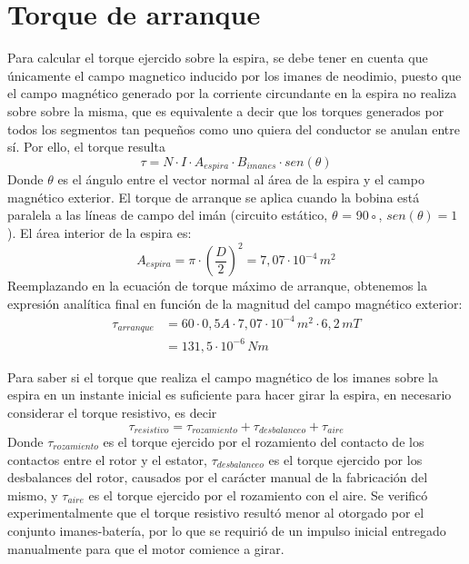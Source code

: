 \documentclass{article}
\begin{document}
\section{Torque de arranque}
Para calcular el torque ejercido sobre la espira, se debe tener en cuenta que únicamente el campo 
magnetico inducido por los imanes de neodimio, puesto que el campo magnético generado por la corriente 
circundante en la espira no realiza sobre sobre la misma, que es equivalente a decir que los torques 
generados por todos los segmentos tan pequeños como uno quiera del conductor se anulan entre sí. Por ello, 
el torque resulta
\begin{equation*}
    \tau = N \cdot I \cdot A_{espira} \cdot B_{imanes} \cdot sen(\theta)
\end{equation*}
Donde $\theta$ es el ángulo entre el vector normal al área de la espira y el campo magnético exterior. El torque de
 arranque se aplica cuando la bobina está paralela a las líneas de campo del imán (circuito estático, 
 $\theta$ = 90◦, $sen(\theta) = 1$). El área interior de la espira es:
\begin{equation*}
    A_{espira} = \pi \cdot \left( \frac{D}{2} \right)^2 = 7,07 \cdot 10^{-4} \, m^2
\end{equation*}
Reemplazando en la ecuación de torque máximo de arranque, obtenemos la expresión analítica final en función
de la magnitud del campo magnético exterior:
\begin{align*}
    \tau_{arranque} &= 60 \cdot 0,5 A \cdot 7,07 \cdot 10^{-4} \, m^2 \cdot 6,2 \, mT \\
                    &= 131,5 \cdot 10^{-6} \, Nm
\end{align*}

 \par Para saber si el torque que realiza el campo magnético de los imanes sobre la espira en un instante inicial
 es suficiente para hacer girar la espira, en necesario considerar el torque resistivo, es decir
 \begin{equation*}
    \tau_{resistivo} = \tau_{rozamiento} + \tau_{desbalanceo} + \tau_{aire}
 \end{equation*}
Donde $\tau_{rozamiento}$ es el torque ejercido por el rozamiento del contacto de los contactos entre el
rotor y el estator, $\tau_{desbalanceo}$ es el torque ejercido por los desbalances del rotor, causados por
el carácter manual de la fabricación del mismo, y $\tau_{aire}$ es el torque ejercido por el rozamiento
con el aire. Se verificó experimentalmente que el torque resistivo resultó menor al otorgado por el conjunto 
imanes-batería, por lo que se requirió de un impulso inicial entregado manualmente para que el motor comience 
a girar.
\end{document}
